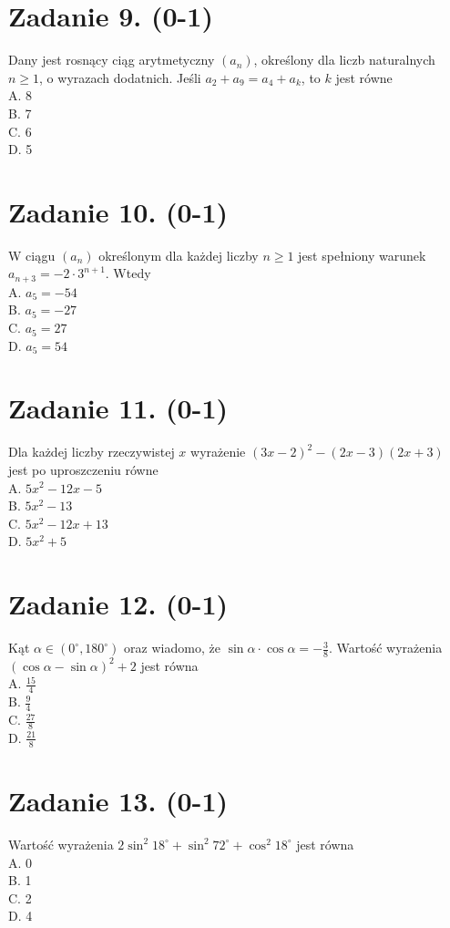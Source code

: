 \documentclass[10pt]{article}
\begin{document}
\section*{Zadanie 9. (0-1)}
Dany jest rosnący ciąg arytmetyczny \(\left(a_{n}\right)\), określony dla liczb naturalnych \(n \geq 1\), o wyrazach dodatnich. Jeśli \(a_{2}+a_{9}=a_{4}+a_{k}\), to \(k\) jest równe\\
A. 8\\
B. 7\\
C. 6\\
D. 5

\section*{Zadanie 10. (0-1)}
W ciągu \(\left(a_{n}\right)\) określonym dla każdej liczby \(n \geq 1\) jest spełniony warunek \(a_{n+3}=-2 \cdot 3^{n+1}\). Wtedy\\
A. \(a_{5}=-54\)\\
B. \(a_{5}=-27\)\\
C. \(a_{5}=27\)\\
D. \(a_{5}=54\)

\section*{Zadanie 11. (0-1)}
Dla każdej liczby rzeczywistej \(x\) wyrażenie \((3 x-2)^{2}-(2 x-3)(2 x+3)\) jest po uproszczeniu równe\\
A. \(5 x^{2}-12 x-5\)\\
B. \(5 x^{2}-13\)\\
C. \(5 x^{2}-12 x+13\)\\
D. \(5 x^{2}+5\)

\section*{Zadanie 12. (0-1)}
Kąt \(\alpha \in\left(0^{\circ}, 180^{\circ}\right)\) oraz wiadomo, że \(\sin \alpha \cdot \cos \alpha=-\frac{3}{8}\). Wartość wyrażenia \((\cos \alpha-\sin \alpha)^{2}+2\) jest równa\\
A. \(\frac{15}{4}\)\\
B. \(\frac{9}{4}\)\\
C. \(\frac{27}{8}\)\\
D. \(\frac{21}{8}\)

\section*{Zadanie 13. (0-1)}
Wartość wyrażenia \(2 \sin ^{2} 18^{\circ}+\sin ^{2} 72^{\circ}+\cos ^{2} 18^{\circ}\) jest równa\\
A. 0\\
B. 1\\
C. 2\\
D. 4
\end{document}

